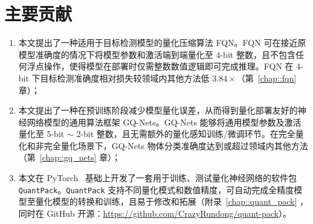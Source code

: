 \section{主要贡献}
\begin{enumerate}
  \item 本文提出了一种适用于目标检测模型的量化压缩算法 FQN。FQN 可在接近原模型准确度的情况下将模型参数和激活端到端量化至 4-bit 整数，且不包含任何浮点操作，使得模型在部署时仅需整数数值逻辑即可完成推理。FQN 在 4-bit 下目标检测准确度相对损失较领域内其他方法低 $3.84\times$（第~\ref{chap::fqn} 章）；
  \item 本文提出了一种在预训练阶段减少模型量化误差，从而得到量化部署友好的神经网络模型的通用算法框架 GQ-Nets。GQ-Nets 能够将通用模型参数及激活量化至 5-bit $\sim$ 2-bit 整数，且无需额外的量化感知训练/微调环节。在完全量化和非完全量化场景下，GQ-Nets 物体分类准确度达到或超过领域内其他方法（第~\ref{chap::gq_nets} 章）；
  \item 本文在 PyTorch~\citep{paszke2019pytorch} 基础上开发了一套用于训练、测试量化神经网络的软件包 \verb|QuantPack|。\verb|QuantPack| 支持不同量化模式和数值精度，可自动完成全精度模型至量化模型的转换和训练，且易于修改和拓展（附录~\ref{chap::quant_pack} ，同时在 GitHub 开源：\url{https://github.com/CrazyRundong/quant-pack}）。
\end{enumerate}